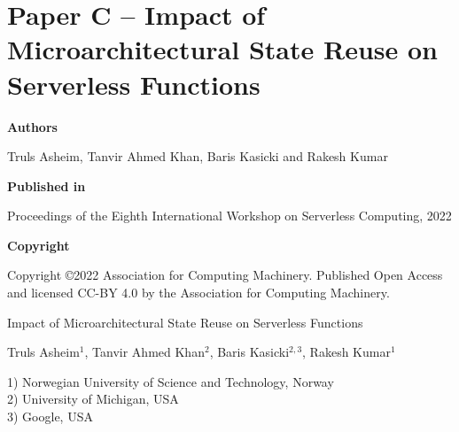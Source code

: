 \documentclass[../../../main.tex]{subfiles}
\begin{document}
{
\chapter[Paper C -- Impact of Microarchitectural State Reuse on Serverless Functions][Paper C -- Microarchitectural State Reuse in Serverless Functions]{Paper C -- Impact of Microarchitectural State Reuse on Serverless Functions}
\label{chap:wosc-paper}

\noindent \textbf{Authors}

\vspace*{0.3cm}

\noindent Truls Asheim, Tanvir Ahmed Khan, Baris Kasicki and Rakesh Kumar

\vspace*{0.7cm}

\noindent \textbf{Published in}

\vspace*{0.3cm}

\noindent Proceedings of the Eighth International Workshop on Serverless Computing, 2022

\vspace*{0.7cm}

\noindent \textbf{Copyright}

\vspace*{0.3cm}

\noindent Copyright ©2022 Association for Computing Machinery. Published Open Access and licensed CC-BY 4.0 by the Association for Computing Machinery.
}
\newpage


\vspace*{0.1cm}

\begin{center}

\Huge{Impact of Microarchitectural State Reuse on Serverless Functions}

\vspace{0.6cm}

\large{Truls Asheim$^{1}$, Tanvir Ahmed Khan$^{2}$, Baris Kasicki$^{2,3}$, Rakesh Kumar$^{1}$}

\vspace{0.1cm}

\small{1) Norwegian University of Science and Technology, Norway}\\
\small{2) University of Michigan, USA}\\
\small{3) Google, USA}\\


\end{center}
\end{document}
